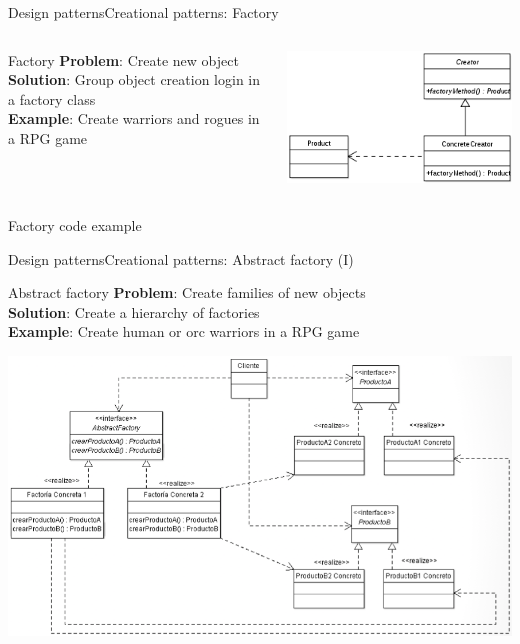 \documentclass[10pt,compress]{beamer} %
\begin{document}
\begin{frame}[plain]{Design patterns}{Creational patterns: Factory}
    \begin{columns}
	   \begin{block}{Factory}
			\textbf{Problem}: Create new object\\
			\textbf{Solution}: Group object creation login in a factory class\\
			\textbf{Example}: Create warriors and rogues in a RPG game\\
		\end{block}
			\centering\includegraphics[width=\linewidth]{figs/factory}\\
	\end{columns}
	\begin{block}{Factory code example}
	    \vspace{-0.2cm}
	    
		\vspace{-0.2cm}
	\end{block}
\end{frame}

\begin{frame}[plain]{Design patterns}{Creational patterns: Abstract factory (I)}
	   \begin{block}{Abstract factory}
			\textbf{Problem}: Create families of new objects\\
			\textbf{Solution}: Create a hierarchy of factories\\
			\textbf{Example}: Create human or orc warriors in a RPG game\\
		\end{block}
		\centering\includegraphics[width=0.8\linewidth]{figs/abstractfactory}\\
\end{frame}
\end{document}
